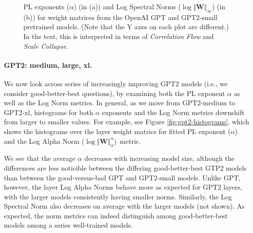 \begin{figure}[htb]
    \centering
    \caption{PL exponents ($\alpha$) (in (a)) and Log Spectral Norms ($\log\Vert\mathbf{W}\Vert_{\infty}$) (in (b)) for weight matrices from the OpenAI GPT and GPT2-small pretrained models.  (Note that the Y axes on each plot are different.)
             In the text, this is interpreted in terms of \emph{Correlation Flow} and \emph{Scale Collapse}.
            }
    \label{fig:gpt-alpha-layers}
\end{figure}


\paragraph{GPT2: medium, large, xl.} 

We now look across series of increasingly improving GPT2 models (i.e., we consider good-better-best questions), by examining both the PL exponent $\alpha$ as well as the Log Norm metrics.  
In general, as we move from GPT2-medium to GPT2-xl, histograms for both $\alpha$ exponents and the Log Norm metrics downshift from larger to smaller values. 
For example, see Figure \ref{fig:gpt2-histograms}, which shows the histograms over the layer weight matrics for fitted PL exponent ($\alpha$) and the Log Alpha Norm ($\log\Vert\mathbf{W}\Vert_{\alpha}^{\alpha}$)~metric.

We see that the average $\alpha$ decreases with increasing model size, although the differences are less noticible between the differing good-better-best GTP2 models than between the good-versus-bad GPT and GPT2-small models.
Unlike GPT, however, the layer Log Alpha Norms behave more as expected for GPT2 layers, with the larger models consistently having smaller norms. 
Similarly, the Log Spectral Norm also decreases on average with the larger models (not shown).  
As expected, the norm metrics can indeed distinguish among good-better-best models among a series well-trained models.

